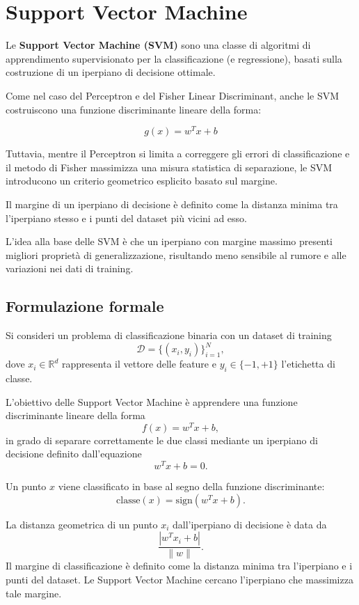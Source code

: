 \documentclass[a4paper,12pt]{report}
\begin{document}
\section{Support Vector Machine}

Le \textbf{Support Vector Machine (SVM)} sono una classe di algoritmi di apprendimento supervisionato per la classificazione (e regressione), basati sulla costruzione di un iperpiano di decisione ottimale.

Come nel caso del Perceptron e del Fisher Linear Discriminant, anche le SVM costruiscono una funzione discriminante lineare della forma:

\[
g(x) = w^T x + b
\]

Tuttavia, mentre il Perceptron si limita a correggere gli errori di classificazione e il metodo di Fisher massimizza una misura statistica di separazione, le SVM introducono un criterio geometrico esplicito basato sul margine.

Il margine di un iperpiano di decisione è definito come la distanza minima tra l’iperpiano stesso e i punti del dataset più vicini ad esso.

L’idea alla base delle SVM è che un iperpiano con margine massimo presenti migliori proprietà di generalizzazione, risultando meno sensibile al rumore e alle variazioni nei dati di training.


\subsection{Formulazione formale}

Si consideri un problema di classificazione binaria con un dataset di training
\[
\mathcal{D} = \{(x_i, y_i)\}_{i=1}^{N},
\]
dove \( x_i \in \mathbb{R}^d \) rappresenta il vettore delle feature e \( y_i \in \{-1,+1\} \) l’etichetta di classe.

L’obiettivo delle Support Vector Machine è apprendere una funzione discriminante lineare della forma
\[
f(x) = w^T x + b,
\]
in grado di separare correttamente le due classi mediante un iperpiano di decisione definito dall’equazione
\[
w^T x + b = 0.
\]

Un punto \( x \) viene classificato in base al segno della funzione discriminante:
\[
\text{classe}(x) = \text{sign}(w^T x + b).
\]

La distanza geometrica di un punto \( x_i \) dall’iperpiano di decisione è data da
\[
\frac{|w^T x_i + b|}{\|w\|}.
\]
Il margine di classificazione è definito come la distanza minima tra l’iperpiano e i punti del dataset.
Le Support Vector Machine cercano l’iperpiano che massimizza tale margine.
\end{document}
